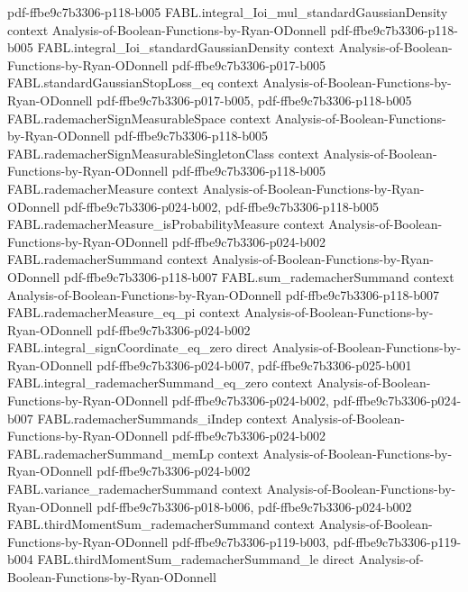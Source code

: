 \begin{theorem}
  {pdf-ffbe9c7b3306-p118-b005}
\proofstep
  {FABL.integral_Ioi_mul_standardGaussianDensity}
  {context}
  {Analysis-of-Boolean-Functions-by-Ryan-ODonnell}
  {pdf-ffbe9c7b3306-p118-b005}
\proofstep
  {FABL.integral_Ioi_standardGaussianDensity}
  {context}
  {Analysis-of-Boolean-Functions-by-Ryan-ODonnell}
  {pdf-ffbe9c7b3306-p017-b005}
\proofstep
  {FABL.standardGaussianStopLoss_eq}
  {context}
  {Analysis-of-Boolean-Functions-by-Ryan-ODonnell}
  {pdf-ffbe9c7b3306-p017-b005,
    pdf-ffbe9c7b3306-p118-b005}
\proofstep
  {FABL.rademacherSignMeasurableSpace}
  {context}
  {Analysis-of-Boolean-Functions-by-Ryan-ODonnell}
  {pdf-ffbe9c7b3306-p118-b005}
\proofstep
  {FABL.rademacherSignMeasurableSingletonClass}
  {context}
  {Analysis-of-Boolean-Functions-by-Ryan-ODonnell}
  {pdf-ffbe9c7b3306-p118-b005}
\proofstep
  {FABL.rademacherMeasure}
  {context}
  {Analysis-of-Boolean-Functions-by-Ryan-ODonnell}
  {pdf-ffbe9c7b3306-p024-b002,
    pdf-ffbe9c7b3306-p118-b005}
\proofstep
  {FABL.rademacherMeasure_isProbabilityMeasure}
  {context}
  {Analysis-of-Boolean-Functions-by-Ryan-ODonnell}
  {pdf-ffbe9c7b3306-p024-b002}
\proofstep
  {FABL.rademacherSummand}
  {context}
  {Analysis-of-Boolean-Functions-by-Ryan-ODonnell}
  {pdf-ffbe9c7b3306-p118-b007}
\proofstep
  {FABL.sum_rademacherSummand}
  {context}
  {Analysis-of-Boolean-Functions-by-Ryan-ODonnell}
  {pdf-ffbe9c7b3306-p118-b007}
\proofstep
  {FABL.rademacherMeasure_eq_pi}
  {context}
  {Analysis-of-Boolean-Functions-by-Ryan-ODonnell}
  {pdf-ffbe9c7b3306-p024-b002}
\proofstep
  {FABL.integral_signCoordinate_eq_zero}
  {direct}
  {Analysis-of-Boolean-Functions-by-Ryan-ODonnell}
  {pdf-ffbe9c7b3306-p024-b007,
    pdf-ffbe9c7b3306-p025-b001}
\proofstep
  {FABL.integral_rademacherSummand_eq_zero}
  {context}
  {Analysis-of-Boolean-Functions-by-Ryan-ODonnell}
  {pdf-ffbe9c7b3306-p024-b002,
    pdf-ffbe9c7b3306-p024-b007}
\proofstep
  {FABL.rademacherSummands_iIndep}
  {context}
  {Analysis-of-Boolean-Functions-by-Ryan-ODonnell}
  {pdf-ffbe9c7b3306-p024-b002}
\proofstep
  {FABL.rademacherSummand_memLp}
  {context}
  {Analysis-of-Boolean-Functions-by-Ryan-ODonnell}
  {pdf-ffbe9c7b3306-p024-b002}
\proofstep
  {FABL.variance_rademacherSummand}
  {context}
  {Analysis-of-Boolean-Functions-by-Ryan-ODonnell}
  {pdf-ffbe9c7b3306-p018-b006,
    pdf-ffbe9c7b3306-p024-b002}
\proofstep
  {FABL.thirdMomentSum_rademacherSummand}
  {context}
  {Analysis-of-Boolean-Functions-by-Ryan-ODonnell}
  {pdf-ffbe9c7b3306-p119-b003,
    pdf-ffbe9c7b3306-p119-b004}
\proofstep
  {FABL.thirdMomentSum_rademacherSummand_le}
  {direct}
  {Analysis-of-Boolean-Functions-by-Ryan-ODonnell}

\end{theorem}
